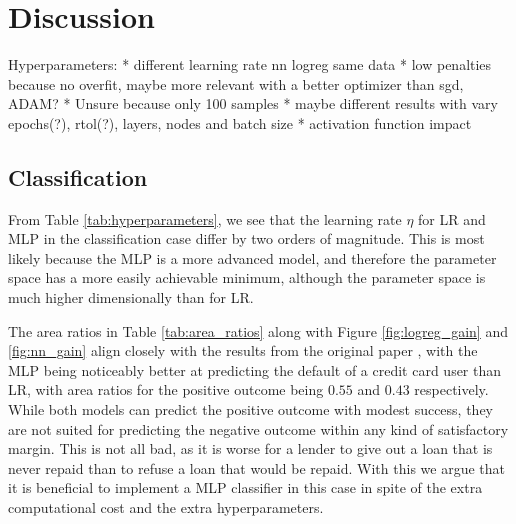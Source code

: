 \documentclass[a4paper, 11pt, twocolumn]{article}
\begin{document}
\section{Discussion}

Hyperparameters:
* different learning rate nn logreg same data
* low penalties because no overfit, maybe more relevant with a better optimizer
than sgd, ADAM?
* Unsure because only 100 samples
* maybe different results with vary epochs(?), rtol(?), layers, nodes and batch size
* activation function impact

\subsection{Classification}
From Table \ref{tab:hyperparameters}, we see that the learning rate $\eta$ for
LR and MLP in the classification case differ by two orders of magnitude. This is
most likely because the MLP is a more advanced model, and therefore the parameter
space has a more easily achievable minimum, although the parameter space is much
higher dimensionally than for LR.


The area ratios in Table \ref{tab:area_ratios} along with Figure
\ref{fig:logreg_gain} and \ref{fig:nn_gain} align closely
with the results from the original paper \cite{origarticle}, with the MLP being
noticeably better at predicting the default of a credit card user than LR, with
area ratios for the positive outcome being $0.55$ and $0.43$ respectively.
While both models can predict the positive outcome with modest success, they are
not suited for predicting the negative outcome within any kind of satisfactory
margin. This is not all bad, as it is worse for a lender to give out a loan that
is never repaid than to refuse a loan that would be repaid. With this we argue
that it is beneficial to implement a MLP classifier in this case in spite of the
extra computational cost and the extra hyperparameters.
\end{document}
